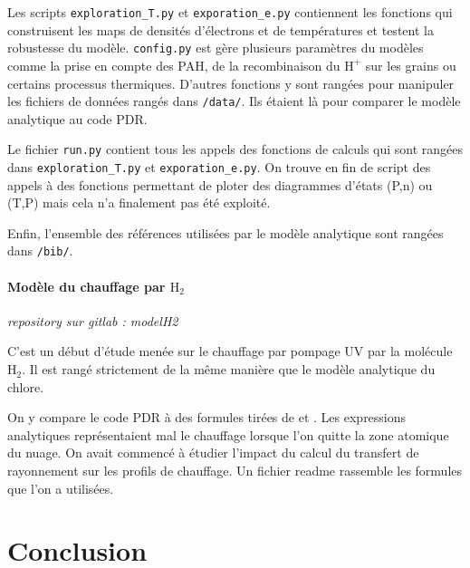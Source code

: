 \documentclass[11pt,a4paper,twoside,openright]{article}
\begin{document}
\begin{spacing}{0.98}
Les scripts \texttt{exploration\_T.py} et \texttt{exporation\_e.py} contiennent les fonctions qui construisent les maps de densités d'électrons et de températures et testent la robustesse du modèle. \texttt{config.py} est gère plusieurs paramètres du modèles comme la prise en compte des PAH, de la recombinaison du $\mathrm{H}^+$ sur les grains ou certains processus thermiques. D'autres fonctions y sont rangées pour manipuler les fichiers de données rangés dans \texttt{/data/}. Ils étaient là pour comparer le modèle analytique au code PDR. \newline

Le fichier \texttt{run.py} contient tous les appels des fonctions de calculs qui sont rangées dans \texttt{exploration\_T.py} et \texttt{exporation\_e.py}. On trouve en fin de script des appels à des fonctions permettant de ploter des diagrammes d'états (P,n) ou (T,P) mais cela n'a finalement pas été exploité.\newline

Enfin, l'ensemble des références utilisées par le modèle analytique sont rangées dans \texttt{/bib/}.

\subsection{Modèle du chauffage par $\mathrm{H}_2$}

\textit{repository sur gitlab : modelH2} \newline


C'est un début d'étude menée sur le chauffage par pompage UV par la molécule $\mathrm{H}_2$. Il est rangé strictement de la même manière que le modèle analytique du chlore. \newline 

On y compare le code PDR à des formules tirées de \cite{Rollig2005} et \cite{BialySternberg_2019}. Les expressions analytiques représentaient mal le chauffage lorsque l'on quitte la zone atomique du nuage. On avait commencé à étudier l'impact du calcul du transfert de rayonnement sur les profils de chauffage. Un fichier readme rassemble les formules que l'on a utilisées.



\setcounter{secnumdepth}{-1}
\clearpage
\part{Conclusion}


\end{spacing}
\end{document}
